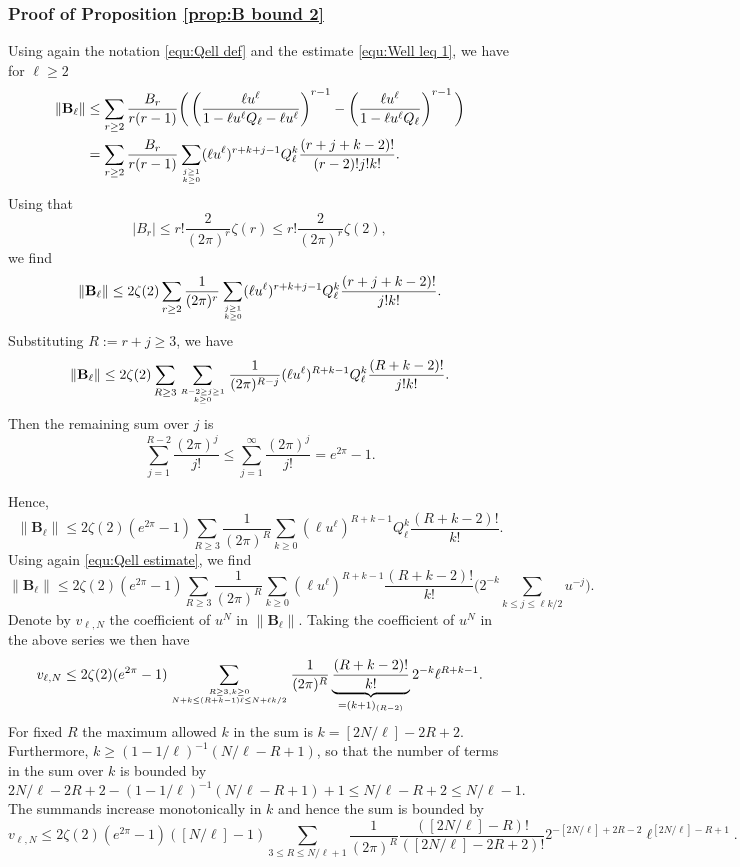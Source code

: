 \documentclass[12pt]{amsart}
\theoremstyle{definition}
\numberwithin{equation}{section}
\newcommand{\bB}{\mathbf{B}}
\theoremstyle{definition} %
\theoremstyle{remark}
\begin{document}
\subsubsection{Proof of Proposition \ref{prop:B bound 2}}
Using again the notation \eqref{equ:Qell def} and the estimate \eqref{equ:Well leq 1}, we have for $\ell\geq 2$
\begin{align*}
\|\bB_\ell\| &\leq \sum_{r\geq 2} \frac{B_r }{r(r-1)}
\bigg( 
  \left(\frac{\ell u^\ell}{1-\ell u^\ell Q_\ell - \ell u^\ell} \right)^{r-1}
  -
  \left(\frac{\ell u^\ell}{1-\ell u^\ell Q_\ell} \right)^{r-1}
\bigg)  
\\&=
\sum_{r\geq 2} \frac{B_r }{r(r-1)} \sum_{j\geq 1 \atop k\geq 0} (\ell u^\ell)^{r+k+j-1} Q_\ell^k \frac{(r+j+k-2)!}{(r-2)!j!k!}.
\end{align*}
Using that 
\[
|B_r| \leq r! \frac{2}{(2\pi)^r} \zeta(r) \leq r! \frac{2}{(2\pi)^r} \zeta(2),
\]
we find 
\[
    \|\bB_\ell\| \leq  2\zeta(2) 
  \sum_{r\geq 2}
  \frac{1}{(2\pi)^r}
  \sum_{j\geq 1 \atop k\geq 0}
  (\ell u^\ell)^{r+k+j-1}
  Q_\ell^k \frac{(r+j+k-2)!}{j!k!}.
\]
Substituting $R:=r+j\geq 3$, we have
\[
    \|\bB_\ell\| \leq  2\zeta(2) 
  \sum_{R\geq 3}
  \sum_{R-2\geq j\geq 1 \atop k\geq 0}
  \frac{1}{(2\pi)^{R-j}}
  (\ell u^\ell)^{R+k-1}
  Q_\ell^k \frac{(R+k-2)!}{j!k!}.
\]
Then the remaining sum over $j$ is 
\[
\sum_{j=1}^{R-2} \frac {(2\pi)^j}{j!}
\leq  \sum_{j=1}^{\infty} \frac {(2\pi)^j}{j!} = e^{2\pi}-1.
\]

Hence, 
\[
    \|\bB_\ell\| \leq 2\zeta(2)(e^{2\pi}-1)
  \sum_{R\geq 3}
  \frac{1}{(2\pi)^R}
  \sum_{ k\geq 0}
  (\ell u^\ell)^{R+k-1}
  Q_\ell^k \frac{(R+k-2)!}{k!}.
\]
Using again \eqref{equ:Qell estimate}, we find 
\[
    \|\bB_\ell\| \leq 2\zeta(2)(e^{2\pi}-1)
  \sum_{R\geq 3}
  \frac{1}{(2\pi)^R}
  \sum_{ k\geq 0}
  (\ell u^\ell)^{R+k-1}
  \frac{(R+k-2)!}{k!}
 \Big( 2^{-k}
  \sum_{k\leq j\leq \ell k/2} u^{-j}
  \Big).
\]
Denote by $v_{\ell,N}$ the coefficient of $u^N$ in $\|\mathbf{B}_\ell\|$.
Taking the coefficient of $u^{N}$ in the above series we then have 
\[
  v_{\ell,N} \leq 2\zeta(2) (e^{2\pi}-1)
  \sum_{R\geq 3, k\geq 0 \atop 
  N +k\leq (R+k-1) \ell \leq N+\ell k /2
  }  
  \frac{1}{(2\pi)^R}
  \underbrace{\frac{(R+k-2)!}{k!}}_{=(k+1)_{(R-2)}}2^{-k} \ell^{R+k-1}.
\]
For fixed $R$ the maximum allowed $k$ in the sum is $k=[2N/\ell]-2R+2$. Furthermore, $k\geq (1-1/\ell)^{-1}(N/\ell -R+1)$, so that the number of terms in the sum over $k$ is bounded by
\[
    2N/\ell-2R+2 -    (1-1/\ell)^{-1}(N/\ell -R+1) +1
    \leq N/\ell -R +2\leq  N/\ell-1.
\] 
The summands increase monotonically in $k$ and hence the sum is bounded by 
\[ v_{\ell,N} \leq
  2\zeta(2) (e^{2\pi}-1)([N/\ell]-1)
  \sum_{3\leq R\leq N/\ell +1
  }  
  \frac{1}{(2\pi)^R}
  \frac{([2N/\ell]-R)!}{([2N/\ell]-2R+2)!} 
  2^{-[2N/\ell]+2R-2}
  \ell^{[2N/\ell]-R+1}.
\]
\end{document}
